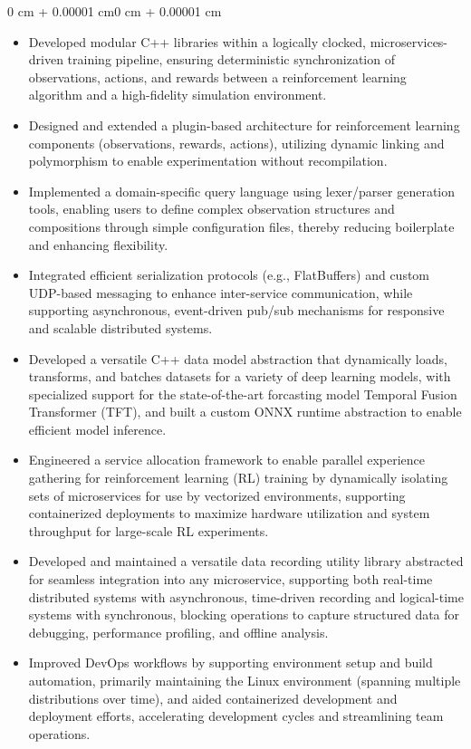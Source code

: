 \documentclass[11pt, letterpaper]{article}
\newenvironment{highlights}{
    \begin{itemize}[
        topsep=0.10 cm,
        parsep=0.10 cm,
        partopsep=0pt,
        itemsep=0pt,
        leftmargin=0.4 cm + 10pt
    ]
}{
    \end{itemize}
}
\newenvironment{onecolentry}{
    \begin{adjustwidth}{0 cm + 0.00001 cm}{0 cm + 0.00001 cm}
}{
    \end{adjustwidth}
}
\begin{document}
\vspace{0.10 cm}
\begin{onecolentry}
    \begin{highlights}
        \item Developed modular C++ libraries within a logically clocked, microservices-driven training pipeline, ensuring deterministic synchronization of observations, actions, and rewards between a reinforcement learning algorithm and a high-fidelity simulation environment.
        \item Designed and extended a plugin-based architecture for reinforcement learning components (observations, rewards, actions), utilizing dynamic linking and polymorphism to enable experimentation without recompilation.
        \item Implemented a domain-specific query language using lexer/parser generation tools, enabling users to define complex observation structures and compositions through simple configuration files, thereby reducing boilerplate and enhancing flexibility.
        \item Integrated efficient serialization protocols (e.g., FlatBuffers) and custom UDP-based messaging to enhance inter-service communication, while supporting asynchronous, event-driven pub/sub mechanisms for responsive and scalable distributed systems.
        \item Developed a versatile C++ data model abstraction that dynamically loads, transforms, and batches datasets for a variety of deep learning models, with specialized support for the state-of-the-art forcasting model Temporal Fusion Transformer (TFT), and built a custom ONNX runtime abstraction to enable efficient model inference.
        \item Engineered a service allocation framework to enable parallel experience gathering for reinforcement learning (RL) training by dynamically isolating sets of microservices for use by vectorized environments, supporting containerized deployments to maximize hardware utilization and system throughput for large-scale RL experiments.
        \item Developed and maintained a versatile data recording utility library abstracted for seamless integration into any microservice, supporting both real-time distributed systems with asynchronous, time-driven recording and logical-time systems with synchronous, blocking operations to capture structured data for debugging, performance profiling, and offline analysis.
        \item Improved DevOps workflows by supporting environment setup and build automation, primarily maintaining the Linux environment (spanning multiple distributions over time), and aided containerized development and deployment efforts, accelerating development cycles and streamlining team operations.

\end{highlights}
\end{onecolentry}
\end{document}
